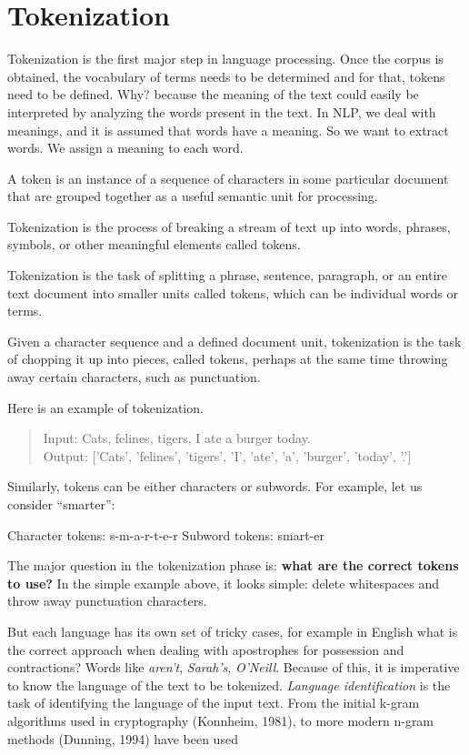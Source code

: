 %
%

\chapter{Tokenization}\label{sec:tokenization}

Tokenization is the first major step in language processing. Once the corpus is obtained, the vocabulary of terms needs to be determined and for that, tokens need to be defined. Why? because the meaning of the text could easily be interpreted by analyzing the words present in the text. In NLP, we deal with meanings, and it is assumed that words have a meaning. So we want to extract words. We assign a meaning to each word.

A token is an instance of a sequence of characters in some particular document that are grouped together as a useful semantic unit for processing.

Tokenization is the process of breaking a stream of text up into words, phrases, symbols, or other meaningful elements called tokens.

Tokenization is the task of splitting a phrase, sentence, paragraph, or an entire text document into smaller units called tokens, which can be individual words or terms.

Given a character sequence and a defined document unit, tokenization is the task of chopping it up into pieces, called tokens, perhaps at the same time throwing away certain characters, such as punctuation.~\cite{Bib:stanford_token}

Here is an example of tokenization.

\begin{quote}
    Input: Cats, felines, tigers, I ate a burger today.\\
    Output: ['Cats', 'felines', 'tigers', 'I', 'ate', 'a', 'burger', 'today', '.']
\end{quote}

Similarly, tokens can be either characters or subwords. For example, let us consider “smarter”:

    Character tokens: s-m-a-r-t-e-r
    Subword tokens: smart-er

The major question in the tokenization phase is: \textbf{what are the correct tokens to use?} In the simple example above, it looks simple: delete whitespaces and throw away punctuation characters. 

But each language has its own set of tricky cases, for example in English what is the correct approach when dealing with apostrophes for possession and contractions? Words like \emph{aren't}, \emph{Sarah's}, \emph{O'Neill}. Because of this, it is imperative to know the language of the text to be tokenized. \textit{Language identification} is the task of identifying the language of the input text. From the initial k-gram algorithms used in cryptography (Konnheim, 1981), to more modern n-gram methods (Dunning, 1994) have been used

